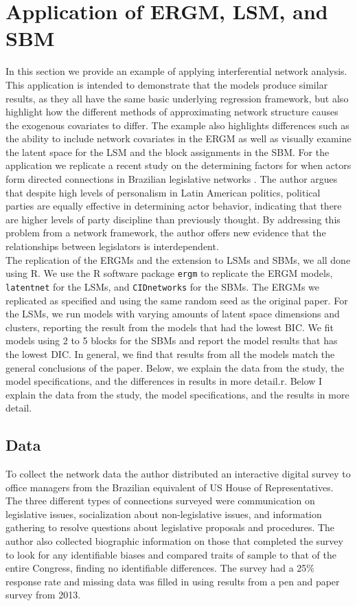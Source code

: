 \documentclass[fleqn,12pt]{wlscirep}
\begin{document}
\section{Application of ERGM, LSM, and SBM}
In this section we provide an example of applying interferential network analysis. This application is intended to demonstrate that the models produce similar results, as they all have the same basic underlying regression framework, but also highlight how the different methods of approximating network structure causes the exogenous covariates to differ. The example also highlights differences such as the ability to include network covariates in the ERGM as well as visually examine the latent space for the LSM and the block assignments in the SBM. For the application we replicate a recent study on the determining factors for when actors form directed connections in Brazilian legislative networks \citep{wojcik2017legislative}. The author argues that despite high levels of personalism in Latin American politics, political parties are equally effective in determining actor behavior, indicating that there are higher levels of party discipline than previously thought. By addressing this problem from a network framework, the author offers new evidence that the relationships between legislators is interdependent.\\

The replication of the ERGMs and the extension to LSMs and SBMs, we all done using R. We use the R software package \texttt{ergm} to replicate the ERGM models, \texttt{latentnet} for the LSMs, and \texttt{CIDnetworks} for the SBMs. The ERGMs we replicated as specified and using the same random seed as the original paper. For the LSMs, we run models with varying amounts of latent space dimensions and clusters, reporting the result from the models that had the lowest BIC. We fit models using 2 to 5 blocks for the SBMs and report the model results that has the lowest DIC. In general, we find that results from all the models match the general conclusions of the paper. Below, we explain the data from the study, the model specifications, and the differences in results in more detail.r. Below I explain the data from the study, the model specifications, and the results in more detail.

\subsection{Data}

To collect the network data the author distributed an interactive digital survey to office managers from the Brazilian equivalent of US House of Representatives. The three different types of connections surveyed were communication on legislative issues, socialization about non-legislative issues, and information gathering to resolve questions about legislative proposals and procedures. The author also collected biographic information on those that completed the survey to look for any identifiable biases and compared traits of sample to that of the entire Congress, finding no identifiable differences. The survey had a 25\% response rate and missing data was filled in using results from a pen and paper survey from 2013.
\end{document}
